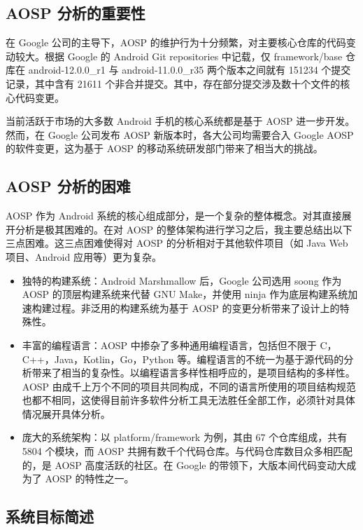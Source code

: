 \subsection{AOSP 分析的重要性}

在 Google 公司的主导下，AOSP 的维护行为十分频繁，对主要核心仓库的代码变动较大。根据 Google 的 Android Git repositories 中记载，仅 framework/base 仓库在 android-12.0.0\_r1 与 android-11.0.0\_r35 两个版本之间就有 151234 个提交记录，其中含有 21611 个非合并提交。其中，存在部分提交涉及数十个文件的核心代码变更。

当前活跃于市场的大多数 Android 手机的核心系统都是基于 AOSP 进一步开发。然而，在 Google 公司发布 AOSP 新版本时，各大公司均需要合入 Google AOSP 的软件变更，这为基于 AOSP 的移动系统研发部门带来了相当大的挑战。

\subsection{AOSP 分析的困难}

AOSP 作为 Android 系统的核心组成部分，是一个复杂的整体概念。对其直接展开分析是极其困难的。在对 AOSP 的整体架构进行学习之后，我主要总结出以下三点困难。这三点困难使得对 AOSP 的分析相对于其他软件项目（如 Java Web 项目、Android 应用等）更为复杂。

\begin{itemize}
    \item 独特的构建系统：Android Marshmallow 后，Google 公司选用 soong 作为 AOSP 的顶层构建系统来代替 GNU Make，并使用 ninja 作为底层构建系统加速构建过程。非泛用的构建系统为基于 AOSP 的变更分析带来了设计上的特殊性。
    \item 丰富的编程语言：AOSP 中掺杂了多种通用编程语言，包括但不限于 C，C++，Java，Kotlin，Go，Python 等。编程语言的不统一为基于源代码的分析带来了相当的复杂性。以编程语言多样性相呼应的，是项目结构的多样性。AOSP 由成千上万个不同的项目共同构成，不同的语言所使用的项目结构规范也都不相同，这使得目前许多软件分析工具无法胜任全部工作，必须针对具体情况展开具体分析。
    \item 庞大的系统架构：以 platform/framework 为例，其由 67 个仓库组成，共有 5804 个模块，而 AOSP 共拥有数千个代码仓库。与代码仓库数目众多相匹配的，是 AOSP 高度活跃的社区。在 Google 的带领下，大版本间代码变动大成为了 AOSP 的特性之一。
\end{itemize}

\subsection{系统目标简述}

